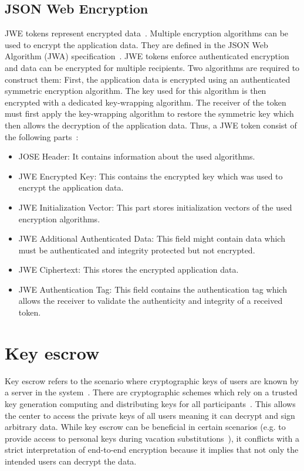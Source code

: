 \documentclass[../main.tex]{subfiles}
\begin{document}
\subsection{JSON Web Encryption}
JWE tokens represent encrypted data~\cite{JWE2015}.
Multiple encryption algorithms can be used to encrypt the application data.
They are defined in the JSON Web Algorithm (JWA) specification~\cite{JWA2015}.
JWE tokens enforce authenticated encryption and data can be encrypted for multiple recipients.
Two algorithms are required to construct them:
First, the application data is encrypted using an authenticated symmetric encryption algorithm.
The key used for this algorithm is then encrypted with a dedicated key-wrapping algorithm.
The receiver of the token must first apply the key-wrapping algorithm to restore the symmetric key which then allows the decryption of the application data.
Thus, a JWE token consist of the following parts~\cite{JWE2015}:
\begin{itemize}
    \item JOSE Header:
    It contains information about the used algorithms.
    \item JWE Encrypted Key:
    This contains the encrypted key which was used to encrypt the application data.
    \item JWE Initialization Vector: This part stores initialization vectors of the used encryption algorithms.
    \item JWE Additional Authenticated Data: This field might contain data which must be authenticated and integrity protected but not encrypted.
    \item JWE Ciphertext: This stores the encrypted application data.
    \item JWE Authentication Tag: This field contains the authentication tag which allows the receiver to validate the authenticity and integrity of a received token.
\end{itemize}


\section{Key escrow}
\label{sec:key-escrow}
Key escrow refers to the scenario where cryptographic keys of users are known by a server in the system~\cite{Gentry2003}.
There are cryptographic schemes which rely on a trusted key generation computing and distributing keys for all participants~\cite{Sakai2007, Bethencourt2007}.
This allows the center to access the private keys of all users meaning it can decrypt and sign arbitrary data.
While key escrow can be beneficial in certain scenarios (e.g. to provide access to personal keys during vacation substitutions~\cite{Hagg2022}), it conflicts with a strict interpretation of end-to-end encryption because it implies that not only the intended users can decrypt the data.
\end{document}
